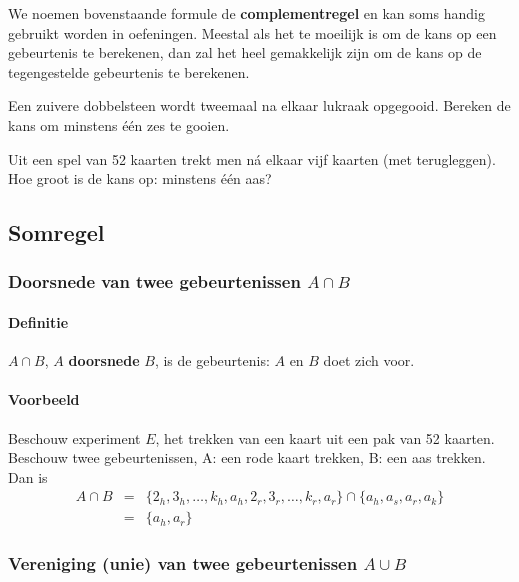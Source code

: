 \documentclass[12pt,twoside]{article}
\begin{document}
We noemen bovenstaande formule de {\bf complementregel} en kan soms handig gebruikt worden in oefeningen. Meestal als het te moeilijk is om de kans op een gebeurtenis te berekenen, dan zal het heel gemakkelijk zijn om de kans op de tegengestelde gebeurtenis te berekenen.

\begin{oefening}
Een zuivere dobbelsteen wordt tweemaal na elkaar lukraak opgegooid. Bereken de
kans om minstens één zes te gooien.
\end{oefening}

\begin{oefening}
Uit een spel van 52 kaarten trekt men ná elkaar vijf kaarten (met terugleggen). Hoe
groot is de kans op: minstens één aas?
\end{oefening}

\subsection{Somregel}

\subsubsection{Doorsnede van twee gebeurtenissen $A\cap B$}

\paragraph*{Definitie}
$A\cap B$, $A$ {\bf doorsnede} $B$, is de gebeurtenis: $A$ en $B$ doet zich voor.

\paragraph*{Voorbeeld}
Beschouw experiment $E$, het trekken van een kaart uit een pak van 52 kaarten. Beschouw twee gebeurtenissen, A: een rode kaart trekken, B: een aas trekken. Dan is\\
\begin{eqnarray*}
A\cap B &=& \{2_h, 3_h, \ldots, k_h, a_h, 2_r, 3_r, \ldots, k_r, a_r\}\cap\{a_h, a_s, a_r, a_k\}\\
        &=& \{a_h, a_r\}
\end{eqnarray*}

\subsubsection{Vereniging (unie) van twee gebeurtenissen $A\cup B$}
\end{document}
